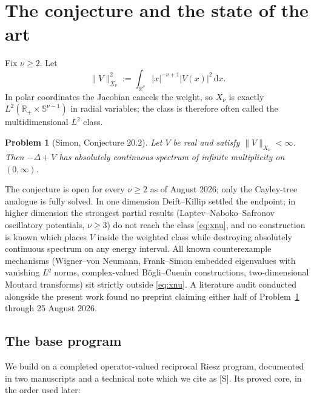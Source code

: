 \documentclass[11pt]{article}
\newtheorem{problem}[theorem]{Problem}
\theoremstyle{remark}
\theoremstyle{definition}
\newcommand{\dd}{\,\mathrm d}
\begin{document}
\tableofcontents

\section{The conjecture and the state of the art}

Fix $\nu\geq2$.  Let
\begin{equation}
 \|V\|_{X_\nu}^2
 :=\int_{\mathbb R^\nu}|x|^{-\nu+1}|V(x)|^2\dd x .
 \label{eq:xnu}
\end{equation}
In polar coordinates the Jacobian cancels the weight, so $X_\nu$ is exactly
$L^2(\mathbb R_+\times\mathbb S^{\nu-1})$ in radial variables; the class is
therefore often called the multidimensional $L^2$ class.

\begin{problem}[Simon, Conjecture 20.2]\label{prob:simon}
Let $V$ be real and satisfy $\|V\|_{X_\nu}<\infty$.  Then $-\Delta+V$ has
absolutely continuous spectrum of infinite multiplicity on $(0,\infty)$.
\end{problem}

The conjecture is open for every $\nu\geq2$ as of August 2026; only the
Cayley-tree analogue is fully solved.  In one dimension Deift--Killip settled
the endpoint; in higher dimension the strongest partial results
(Laptev--Naboko--Safronov oscillatory potentials, $\nu\geq3$) do not reach the
class \eqref{eq:xnu}, and no construction is known which places $V$ inside
the weighted class while destroying absolutely continuous spectrum on any
energy interval.  All known counterexample mechanisms (Wigner--von Neumann,
Frank--Simon embedded eigenvalues with vanishing $L^q$ norms, complex-valued
B\"ogli--Cuenin constructions, two-dimensional Moutard transforms) sit
strictly outside \eqref{eq:xnu}.  A literature audit conducted alongside the
present work found no preprint claiming either half of Problem~\ref{prob:simon}
through 25 August 2026.

\subsection{The base program}\label{sec:base}

We build on a completed operator-valued reciprocal Riesz program, documented
in two manuscripts and a technical note which we cite as [S].  Its proved
core, in the order used later:
\end{document}
